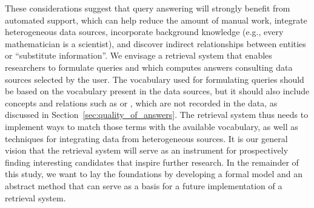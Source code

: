 These considerations suggest that query answering will
strongly benefit from automated support,
which can help reduce the amount of manual work, integrate heterogeneous data sources,
incorporate background knowledge (e.g., every mathematician is a scientist),
and discover indirect relationships between entities or \enquote{substitute information}.
We envisage a retrieval system that enables researchers to formulate queries 
and which computes answers consulting data sources selected by the user.
The vocabulary used for formulating queries should be based on the vocabulary
present in the data sources, but it should also include concepts and relations
such as  or ,
which are not recorded in the data, as discussed in
Section~\ref{sec:quality_of_answers}. The retrieval system thus needs to implement ways
to match those terms with the available vocabulary, as well as techniques
for integrating data from heterogeneous sources.
It is our general vision that the retrieval system will serve as an instrument for prospectively finding interesting
candidates that inspire further research.
In the remainder of this study, we want to lay the foundations by developing
a formal model and an abstract method
that can serve as a basis for a future implementation of a retrieval system.

